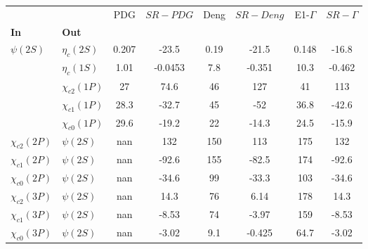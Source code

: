 \begin{tabular}{l|l|c|c|c|c|c|c}
\toprule
                &            &   PDG & $SR-PDG$ &  Deng & $SR-Deng$ &  E1-$\Gamma$ & $SR-\Gamma$ \\
\textbf{In} & \textbf{Out} &       &          &       &           &              &             \\
\midrule
\textbf{$\psi(2S)$} & \textbf{$\eta_{c}(2S)$} & 0.207 &    -23.5 &  0.19 &     -21.5 &        0.148 &       -16.8 \\
                & \textbf{$\eta_{c}(1S)$} &  1.01 &  -0.0453 &   7.8 &    -0.351 &         10.3 &      -0.462 \\
                & \textbf{$\chi_{c2}(1P)$} &    27 &     74.6 &    46 &       127 &           41 &         113 \\
                & \textbf{$\chi_{c1}(1P)$} &  28.3 &    -32.7 &    45 &       -52 &         36.8 &       -42.6 \\
                & \textbf{$\chi_{c0}(1P)$} &  29.6 &    -19.2 &    22 &     -14.3 &         24.5 &       -15.9 \\
\textbf{$\chi_{c2}(2P)$} & \textbf{$\psi(2S)$} &   nan &      132 &   150 &       113 &          175 &         132 \\
\textbf{$\chi_{c1}(2P)$} & \textbf{$\psi(2S)$} &   nan &    -92.6 &   155 &     -82.5 &          174 &       -92.6 \\
\textbf{$\chi_{c0}(2P)$} & \textbf{$\psi(2S)$} &   nan &    -34.6 &    99 &     -33.3 &          103 &       -34.6 \\
\textbf{$\chi_{c2}(3P)$} & \textbf{$\psi(2S)$} &   nan &     14.3 &    76 &      6.14 &          178 &        14.3 \\
\textbf{$\chi_{c1}(3P)$} & \textbf{$\psi(2S)$} &   nan &    -8.53 &    74 &     -3.97 &          159 &       -8.53 \\
\textbf{$\chi_{c0}(3P)$} & \textbf{$\psi(2S)$} &   nan &    -3.02 &   9.1 &    -0.425 &         64.7 &       -3.02 \\
\bottomrule
\end{tabular}
